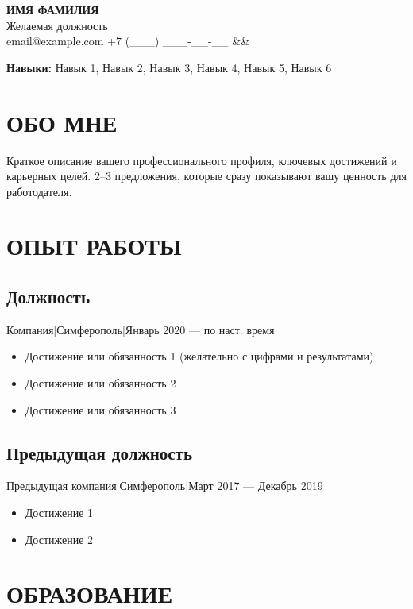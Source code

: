 \documentclass[11pt,a4paper]{article}
\makeatletter
\newcommand{\cvheader}[5]{
  \begin{center}
    {\Huge\bfseries\color{cvblue} #1}\\[0.3em]
    {\large\color{cvgray} #2}\\[0.5em]
    \small
    \color{cvgray}
    \hspace{0.5em}\faSymbol{@} #3%
    \hspace{1em}\faSymbol{phone} #4%
    \ifx&#5&\else\hspace{1em}\faSymbol{link} #5\fi
  \end{center}
  \vspace{0.5em}
}
\newcommand{\skilllist}[1]{
  \begin{center}
    \small\textbf{\color{cvblue}Навыки:}\enspace
    \color{cvgray}#1
  \end{center}
}
\newenvironment{jobentry}[4]{
  \subsection*{#1}
  {\small\color{cvgray}#2\enspace|\enspace#3\enspace|\enspace#4}\par
  \vspace{0.3em}
  \begin{itemize}[leftmargin=*,nosep,itemsep=0.1em]
}{
  \end{itemize}
}
\makeatother
\begin{document}

\cvheader
  {ИМЯ ФАМИЛИЯ}          %
  {Желаемая должность}   %
  {email@example.com}    %
  {+7 (___) ___-__-__}   %
  {}                     %

\skilllist{Навык 1, Навык 2, Навык 3, Навык 4, Навык 5, Навык 6}

\section{ОБО МНЕ}

Краткое описание вашего профессионального профиля, ключевых достижений и карьерных целей. 2–3 предложения, которые сразу показывают вашу ценность для работодателя.

\section{ОПЫТ РАБОТЫ}

\begin{jobentry}
  {Должность}            %
  {Компания}             %
  {Симферополь}          %
  {Январь 2020 — по наст. время}  %
  \item Достижение или обязанность 1 (желательно с цифрами и результатами)
  \item Достижение или обязанность 2
  \item Достижение или обязанность 3
\end{jobentry}

\begin{jobentry}
  {Предыдущая должность}
  {Предыдущая компания}
  {Симферополь}
  {Март 2017 — Декабрь 2019}
  \item Достижение 1
  \item Достижение 2
\end{jobentry}

\section{ОБРАЗОВАНИЕ}
\end{document}
